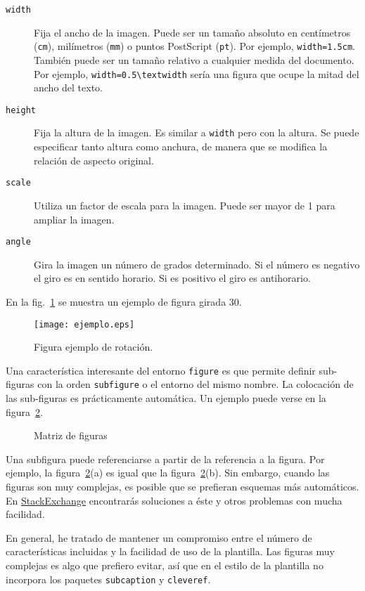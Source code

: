 \begin{description}
\item[\texttt{width}]  Fija el ancho de la imagen.  Puede ser un tamaño absoluto en centímetros (\texttt{cm}), milímetros (\texttt{mm}) o puntos PostScript (\texttt{pt}).  Por ejemplo,  \verb|width=1.5cm|.  También puede ser un tamaño relativo a cualquier medida del documento.  Por ejemplo, \verb|width=0.5\textwidth| sería una figura que ocupe la mitad del ancho del texto.

\item[\texttt{height}] Fija la altura de la imagen.  Es similar a \texttt{width} pero con la altura.  Se puede especificar tanto altura como anchura, de manera que se modifica la relación de aspecto original.

\item[\texttt{scale}] Utiliza un factor de escala para la imagen.  Puede ser mayor de 1 para ampliar la imagen.

\item[\texttt{angle}] Gira la imagen un número de grados determinado.  Si el número es negativo el giro es en sentido horario.  Si es positivo el giro es antihorario.
\end{description}


En la fig.~\ref{fig:figura-angulo-30} se muestra un ejemplo de figura girada 30.

\begin{figure}[btp]
\centering
\texttt{[image: ejemplo.eps]}
\caption{Figura ejemplo de rotación.}
\label{fig:figura-angulo-30}
\end{figure}

Una característica interesante del entorno \texttt{figure} es que permite definir sub-figuras con la orden \texttt{subfigure} o el entorno del mismo nombre.  La colocación de las sub-figuras es prácticamente automática.  Un ejemplo puede verse en la figura~\ref{fig:matriz-figuras}.

\begin{figure}[htbp]
\centering
{}
\caption{Matriz de figuras} 
\label{fig:matriz-figuras}
\end{figure}

Una subfigura puede referenciarse a partir de la referencia a la figura.  Por ejemplo, la figura~\ref{fig:matriz-figuras}(a) es igual que la figura~\ref{fig:matriz-figuras}(b). Sin embargo, cuando las figuras son muy complejas, es posible que se prefieran esquemas más automáticos.  En \href{https://tex.stackexchange.com/questions/181225/how-to-reference-to-subfigure-in-latex}{StackExchange} encontrarás soluciones a éste y otros problemas con mucha facilidad.

En general, he tratado de mantener un compromiso entre el número de características incluidas y la facilidad de uso de la plantilla.  Las figuras muy complejas es algo que prefiero evitar, así que en el estilo de la plantilla no incorpora los paquetes \texttt{subcaption} y \texttt{cleveref}.
